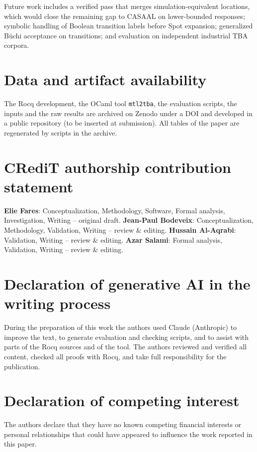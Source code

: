 Future work includes a verified pass that merges simulation-equivalent locations, which would close the remaining gap to CASAAL on lower-bounded responses; symbolic handling of Boolean transition labels before Spot expansion; generalized B\"uchi acceptance on transitions; and evaluation on independent industrial TBA corpora.

\section*{Data and artifact availability}
\label{sec:availability}
The Rocq development, the OCaml tool \texttt{mtl2tba}, the evaluation scripts, the inputs and the raw results are archived on Zenodo under a DOI and developed in a public repository (to be inserted at submission). All tables of the paper are regenerated by scripts in the archive.

\section*{CRediT authorship contribution statement}
\textbf{Elie Fares}: Conceptualization, Methodology, Software, Formal analysis, Investigation, Writing -- original draft. \textbf{Jean-Paul Bodeveix}: Conceptualization, Methodology, Validation, Writing -- review \& editing. \textbf{Hussain Al-Aqrabi}: Validation, Writing -- review \& editing. \textbf{Azar Salami}: Formal analysis, Validation, Writing -- review \& editing.

\section*{Declaration of generative AI in the writing process}
During the preparation of this work the authors used Claude (Anthropic) to improve the text, to generate evaluation and checking scripts, and to assist with parts of the Rocq sources and of the tool. The authors reviewed and verified all content, checked all proofs with Rocq, and take full responsibility for the publication.

\section*{Declaration of competing interest}
The authors declare that they have no known competing financial interests or personal relationships that could have appeared to influence the work reported in this paper.





